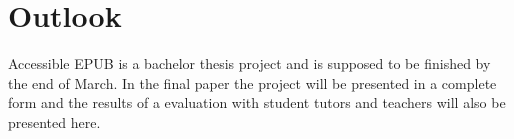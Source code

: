 \documentclass{llncs}
\begin{document}
\section{Outlook}
Accessible EPUB is a bachelor thesis project and is supposed to be finished by the end of March. In the final paper the project will be presented in a complete form and the results of a evaluation with student tutors and teachers will also be presented here. 



\end{document}
